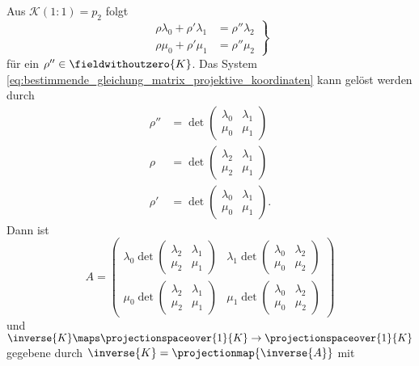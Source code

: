Aus \( \mathcal{K}(1:1)=p_2 \) folgt
\begin{equation*}
  \left.\begin{aligned}
    \rho\lambda_0 +\rho'\lambda_1&=\rho''\lambda_2\\
    \rho\mu_0+\rho'\mu_1&=\rho'' \mu_2
  \end{aligned}\right\}\label{eq:bestimmende_gleichung_matrix_projektive_koordinaten}\tag{*}
\end{equation*}
für ein \( \rho''\in \fieldwithoutzero{K} \). Das System \eqref{eq:bestimmende_gleichung_matrix_projektive_koordinaten} kann \zb gelöst werden durch
\begin{align*}
  \rho''&=\det \begin{pmatrix} \lambda_0 & \lambda_1 \\ \mu_0 & \mu_1 \end{pmatrix}\\
    \rho&=\det \begin{pmatrix} \lambda_2 & \lambda_1 \\ \mu_2 & \mu_1 \end{pmatrix}\\
    \rho'&=\det \begin{pmatrix} \lambda_0 & \lambda_1 \\ \mu_0 & \mu_1 \end{pmatrix}.
\end{align*}
Dann ist
\begin{equation*}
  A=\begin{pmatrix} \lambda_0 \det \begin{pmatrix} \lambda_2 & \lambda_1 \\ \mu_2 & \mu_1 \end{pmatrix} & \lambda_1 \det \begin{pmatrix} \lambda_0 & \lambda_2 \\ \mu_0 & \mu_2 \end{pmatrix} \\ \mu_0 \det \begin{pmatrix} \lambda_2 & \lambda_1 \\ \mu_2 & \mu_1 \end{pmatrix} & \mu_1 \det \begin{pmatrix} \lambda_0 & \lambda_2 \\ \mu_0 & \mu_2 \end{pmatrix} \end{pmatrix}
\end{equation*}
und \( \inverse{K}\maps \projectionspaceover{1}{K}\to\projectionspaceover{1}{K} \) gegebene durch \( \inverse{K}=\projectionmap{\inverse{A}} \) mit
